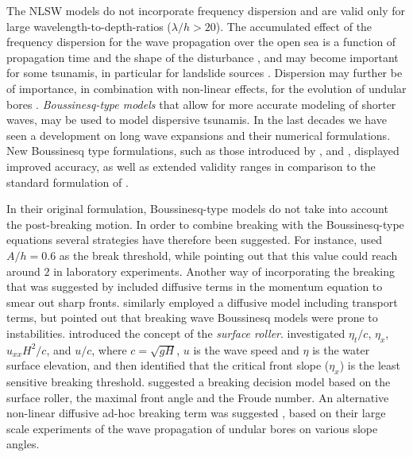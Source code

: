 \documentclass[review]{elsarticle}
\begin{document}
The  NLSW models do not incorporate frequency dispersion and  are valid only for large wavelength-to-depth-ratios ($\lambda/h>20$).
The accumulated effect of the frequency dispersion for the wave propagation over the open sea is 
a function of propagation time and the shape of the disturbance \citep{Glimsdal2013},
and may become important for some tsunamis, in particular for landslide sources \citep{Lovholt2015}. 
Dispersion may further be of importance, in combination with non-linear effects,
for the evolution of undular bores \citep{Behrens2015}.
{\em Boussinesq-type models} that allow for more accurate modeling of shorter waves, may be used to model dispersive tsunamis.
In the last decades we have seen a development on long wave expansions and their numerical formulations. 
New Boussinesq type formulations, such as those introduced by \cite{madsen1992new}, and \cite{nwogu1993alternative}, displayed improved accuracy, as well as extended validity ranges in comparison to the standard formulation of \cite{peregrine1967long}.

In their original formulation, Boussinesq-type models 
do not take into account the post-breaking motion. 
In order to combine breaking with  the Boussinesq-type equations
several strategies have therefore been suggested. For instance, \citet{peregrine1967long} used $A/h=0.6$ 
as the break threshold, while pointing out that this value could reach around $2$ in laboratory experiments. 
Another way of incorporating the breaking that was suggested by \cite{Kennedy2000} included diffusive terms
in the momentum equation to smear out sharp fronts. \citet{Lovholt:2013a} similarly employed a diffusive model including transport terms, but pointed out that breaking wave Boussinesq models were prone to instabilities. 
\citet{schaffer1993boussinesq} introduced the concept of the {\em surface roller}. \citet{lynett2006nearshore} investigated $\eta_t/c$, $\eta_x$, $u_{xx} H^2/c$, and $u/c$, 
where $c=\sqrt{gH}$, $u$ is the wave speed and $\eta$ is 
the water surface elevation, 
and then identified that the critical front slope ($\eta_x$) 
is the least sensitive breaking threshold. \citet{tissier2012new} suggested
a breaking decision model based on the surface roller, the maximal front angle and the Froude number.
An alternative non-linear diffusive ad-hoc breaking term was suggested \citet{matsuyama2007study},
based on their large scale experiments of the wave propagation of undular bores on various slope angles. 
\end{document}
